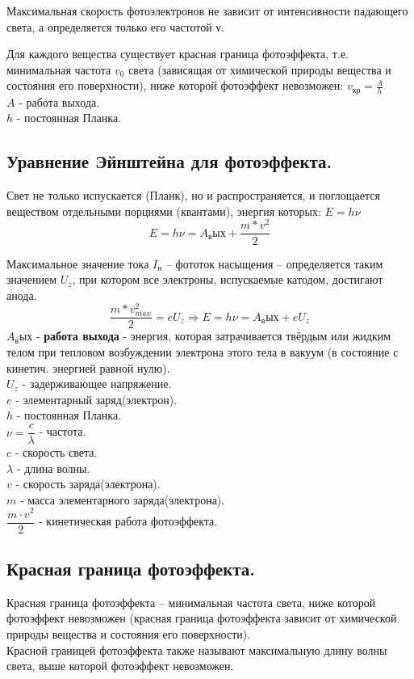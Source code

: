 \documentclass[12pt]{report}
\begin{document}
Максимальная скорость фотоэлектронов не зависит от интенсивности падающего света, а определяется только его частотой ν.

Для каждого вещества существует красная граница фотоэффекта, т.е. минимальная частота $v_0$ света (зависящая от химической природы вещества и состояния его поверхности), ниже которой фотоэффект невозможен: $v_\text{кр}=\frac{A}{h}$\\
$A$ - работа выхода.\\
$h$ - постоянная Планка.
\subsection{ Уравнение Эйнштейна для фотоэффекта.}
Свет не только испускается (Планк), но и распространяется, и поглощается веществом отдельными порциями (квантами), энергия которых: $ E = h\nu $\\
\[E=h\nu=A_вых+\frac{m*v^2}{2}\]

Максимальное значение тока $I_н$ – фототок насыщения – определяется
таким значением $U_z$, при котором все электроны, испускаемые катодом, достигают анода.\\
\[\frac{m*v_{max}^2}{2}=eU_z \Rightarrow{} E=h\nu=A_вых+eU_z\]
$A_вых$ - \textbf{работа выхода} - энергия, которая затрачивается
твёрдым или жидким телом при тепловом
возбуждении электрона этого тела в вакуум (в
состояние с кинетич. энергией равной нулю).\\

$U_z$ - задерживающее напряжение.\\

$e$ - элементарный заряд(электрон).\\

$h$ - постоянная Планка.\\

$\nu = \dfrac{c}{\lambda}$ - частота.\\

$c$ - скорость света.\\

$\lambda$ - длина волны.\\

$v$ - скорость заряда(электрона).\\

$m$ - масса элементарного заряда(электрона).\\

$\dfrac{m \cdot v^2}{2}$ - кинетическая работа фотоэффекта.
\subsection{Красная граница фотоэффекта.}
Красная граница фотоэффекта – минимальная частота света, ниже которой фотоэффект невозможен (красная граница фотоэффекта зависит от химической природы вещества и состояния его поверхности).\\
Красной границей фотоэффекта также называют максимальную длину волны света, выше которой фотоэффект невозможен.
\end{document}
